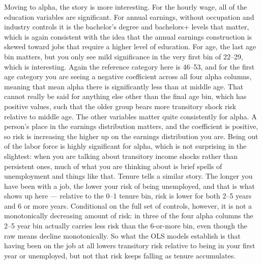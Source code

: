 \documentclass[12pt]{article}
\begin{document}
\begin{onehalfspace}
Moving to alpha, the story is more interesting. For the hourly wage, all of the education variables are significant. For annual earnings, without occupation and industry controls it is the bachelor's degree and bachelors+ levels that matter, which is again consistent with the idea that the annual earnings construction is skewed toward jobs that require a higher level of education. For age, the last age bin matters, but you only see mild significance in the very first bin of 22--29, which is interesting. Again the reference category here is 46--53, and for the first age category you are seeing a negative coefficient across all four alpha columns, meaning that mean alpha there is significantly less than at middle age. That cannot really be said for anything else other than the final age bin, which has positive values, such that the older group bears more transitory shock risk relative to middle age. The other variables matter quite consistently for alpha. A person's place in the earnings distribution matters, and the coefficient is positive, so risk is increasing the higher up on the earnings distribution you are. Being out of the labor force is highly significant for alpha, which is not surprising in the slightest: when you are talking about transitory income shocks rather than persistent ones, much of what you are thinking about is brief spells of unemployment and things like that. Tenure tells a similar story. The longer you have been with a job, the lower your risk of being unemployed, and that is what shows up here --- relative to the 0--1 tenure bin, risk is lower for both 2--5 years and 6 or more years. Conditional on the full set of controls, however, it is not a monotonically decreasing amount of risk: in three of the four alpha columns the 2--5 year bin actually carries less risk than the 6-or-more bin, even though the raw means decline monotonically. So what the OLS models establish is that having been on the job at all lowers transitory risk relative to being in your first year or unemployed, but not that risk keeps falling as tenure accumulates.


\end{onehalfspace}
\end{document}
